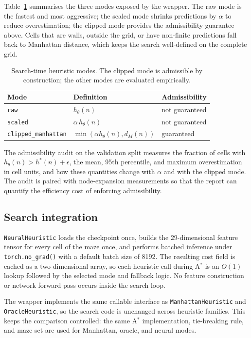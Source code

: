 \documentclass[11pt]{article}
\begin{document}
Table~\ref{tab:heuristic_modes} summarises the three modes exposed by the
wrapper. The raw mode is the fastest and most aggressive; the scaled mode
shrinks predictions by $\alpha$ to reduce overestimation; the clipped mode
provides the admissibility guarantee above. Cells that are walls, outside the
grid, or have non-finite predictions fall back to Manhattan distance, which
keeps the search well-defined on the complete grid.

\begin{table}[H]
  \centering
  \caption{Search-time heuristic modes. The clipped mode is admissible by
  construction; the other modes are evaluated empirically.}
  \label{tab:heuristic_modes}
  \begin{tabular}{lll}
    \toprule
    Mode & Definition & Admissibility \\
    \midrule
    \texttt{raw}               & $h_\theta(n)$                          & not guaranteed \\
    \texttt{scaled}            & $\alpha\,h_\theta(n)$                  & not guaranteed \\
    \texttt{clipped\_manhattan}& $\min(\alpha h_\theta(n), d_M(n))$     & guaranteed \\
    \bottomrule
  \end{tabular}
\end{table}

The admissibility audit on the validation split measures the fraction of cells
with $h_\theta(n)>h^\ast(n)+\epsilon$, the mean, 95th percentile, and maximum
overestimation in cell units, and how these quantities change with $\alpha$ and
with the clipped mode. The audit is paired with node-expansion measurements so
that the report can quantify the efficiency cost of enforcing admissibility.

\subsection{Search integration}
\texttt{NeuralHeuristic} loads the checkpoint once, builds the 29-dimensional
feature tensor for every cell of the maze once, and performs batched inference
under \texttt{torch.no\_grad()} with a default batch size of 8192. The
resulting cost field is cached as a two-dimensional array, so each heuristic
call during A$^\ast$ is an $O(1)$ lookup followed by the selected mode and
fallback logic. No feature construction or network forward pass occurs inside
the search loop.

The wrapper implements the same callable interface as
\texttt{ManhattanHeuristic} and \texttt{OracleHeuristic}, so the search code is
unchanged across heuristic families. This keeps the comparison controlled: the
same A$^\ast$ implementation, tie-breaking rule, and maze set are used for
Manhattan, oracle, and neural modes.
\end{document}
